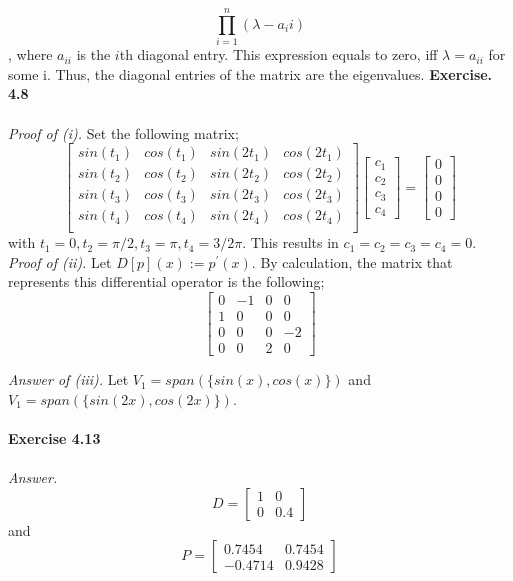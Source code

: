 \documentclass[letterpaper,12pt]{article}
\theoremstyle{definition}
\begin{document}
\[\prod_{i=1}^{n}(\lambda - a_ii)\]
, where $a_{ii}$ is the $i$th diagonal entry. This expression equals to zero, iff $\lambda = a_{ii}$ for some i. Thus, the diagonal entries of the matrix are the eigenvalues.
\newline
\textbf{Exercise. 4.8} \\\\
\emph{Proof of (i). } Set the following matrix;
\[\begin{bmatrix}
    sin(t_1) & cos(t_1) & sin(2t_1) & cos(2t_1) \\
    sin(t_2) & cos(t_2) & sin(2t_2) & cos(2t_2) \\
    sin(t_3) & cos(t_3) & sin(2t_3) & cos(2t_3) \\
    sin(t_4) & cos(t_4) & sin(2t_4) & cos(2t_4) \\
  \end{bmatrix}  \begin{bmatrix}
                   c_1 \\
                   c_2 \\
                   c_3 \\
                   c_4
                 \end{bmatrix}  = \begin{bmatrix}
                                    0 \\
                                    0 \\
                                    0 \\
                                    0
                                  \end{bmatrix}\]
with $t_1 = 0, t_2 = \pi /2, t_3 = \pi, t_4 = 3/2 \pi$. This results in $c_1=c_2=c_3=c_4=0$.
\newline
\emph{Proof of (ii).} Let $D[p](x) := p^{'}(x)$. By calculation, the matrix that represents this differential operator is the following;
\[ \begin{bmatrix}
     0 & -1 & 0 & 0 \\
     1 & 0 & 0 & 0 \\
     0 & 0 & 0 & -2 \\
     0 & 0 & 2 & 0
   \end{bmatrix}\]

\emph{Answer of (iii). }
Let $V_1 = span(\{sin(x), cos(x)\})$ and $V_1 = span(\{sin(2x), cos(2x)\})$. \\\\



\textbf{Exercise 4.13} \\\\
\emph{Answer.}
\[D = \begin{bmatrix}
    1 & 0 \\
    0 & 0.4
  \end{bmatrix}\]
and
\[P = \begin{bmatrix}
        0.7454 & 0.7454 \\
        -0.4714 & 0.9428
      \end{bmatrix}\]
\end{document}
